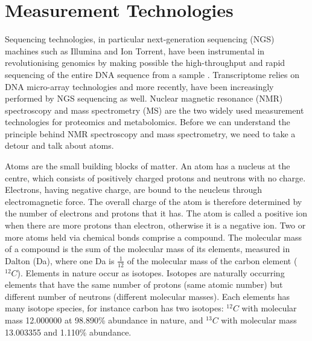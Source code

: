 \section{Measurement Technologies\label{sub:mass-spec}}

Sequencing technologies, in particular next-generation sequencing (NGS) machines such as Illumina and Ion Torrent, have been instrumental in revolutionising genomics by making possible the high-throughput and rapid sequencing of the entire DNA sequence from a sample \cite{metzker2010sequencing}. Transcriptome relies on DNA micro-array technologies and more recently, have been increasingly performed by NGS sequencing as well. Nuclear magnetic resonance (NMR) spectroscopy and mass spectrometry (MS) are the two widely used measurement technologies for proteomics and metabolomics. Before we can understand the principle behind NMR spectroscopy and mass spectrometry, we need to take a detour and talk about atoms.

Atoms are the small building blocks of matter. An atom has a nucleus at the centre, which consists of positively charged protons and neutrons with no charge. Electrons, having negative charge, are bound to the neucleus through electromagnetic force. The overall charge of the atom is therefore determined by the number of electrons and protons that it has. The atom is called a positive ion when there are more protons than electron, otherwise it is a negative ion. Two or more atoms held via chemical bonds comprise a compound. The molecular mass of a compound is the sum of the molecular mass of its elements, measured in Dalton (Da), where one Da is $\frac{1}{12}$ of the molecular mass of the carbon element ($^{12}C$). Elements in nature occur as isotopes. Isotopes are naturally occurring elements that have the same number of protons (same atomic number) but different number of neutrons (different molecular masses). Each elements has many isotope species, for instance carbon has two isotopes: $^{12}C$ with molecular mass 12.000000 at 98.890\% abundance in nature, and $^{13}C$ with molecular mass 13.003355 and 1.110\% abundance. %

